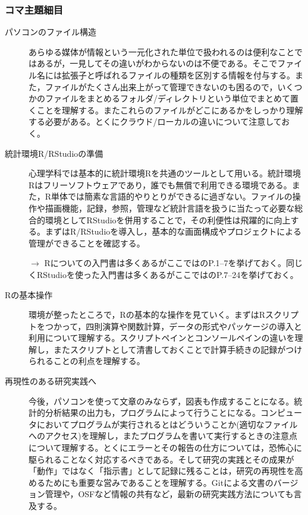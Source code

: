 \subsubsection{コマ主題細目}
\begin{description}

	\item[パソコンのファイル構造]あらゆる媒体が情報という一元化された単位で扱われるのは便利なことではあるが，一見してその違いがわからないのは不便である。そこでファイル名には拡張子と呼ばれるファイルの種類を区別する情報を付与する。また，ファイルがたくさん出来上がって管理できないのも困るので，いくつかのファイルをまとめるフォルダ/ディレクトリという単位でまとめて置くことを理解する。またこれらのファイルがどこにあるかをしっかり理解する必要がある。とくにクラウド/ローカルの違いについて注意しておく。


	\item[統計環境R/RStudioの準備] 心理学科では基本的に統計環境Rを共通のツールとして用いる。統計環境Rはフリーソフトウェアであり，誰でも無償で利用できる環境である。また，R単体では簡素な言語的やりとりができるに過ぎない。ファイルの操作や描画機能，記録，参照，管理など統計言語を扱うに当たって必要な総合的環境としてRStudioを併用することで，その利便性は飛躍的に向上する。まずはR/RStudioを導入し，基本的な画面構成やプロジェクトによる管理ができることを確認する。
	      \begin{flushright}
		      $\to$ Rについての入門書は多くあるがここでは\citet{kosugi2019}のP.1--7を挙げておく。同じくRStudioを使った入門書は多くあるがここでは\citet{kosugi2019}のP.7--24を挙げておく。
	      \end{flushright}

	\item[Rの基本操作]環境が整ったところで，Rの基本的な操作を見ていく。まずはRスクリプトをつかって，四則演算や関数計算，データの形式やパッケージの導入と利用について理解する。スクリプトペインとコンソールペインの違いを理解し，またスクリプトとして清書しておくことで計算手続きの記録がつけられることの利点を理解する。

	\item[再現性のある研究実践へ]今後，パソコンを使って文章のみならず，図表も作成することになる。統計的分析結果の出力も，プログラムによって行うことになる。コンピュータにおいてプログラムが実行されるとはどういうことか(適切なファイルへのアクセス)を理解し，またプログラムを書いて実行するときの注意点について理解する。とくにエラーとその報告の仕方については，恐怖心に駆られることなく対応するべきである。そして研究の実践とその成果が「動作」ではなく「指示書」として記録に残ることは，研究の再現性を高めるためにも重要な営みであることを理解する。Gitによる文書のバージョン管理や，OSFなど情報の共有など，最新の研究実践方法についても言及する。


\end{description}
